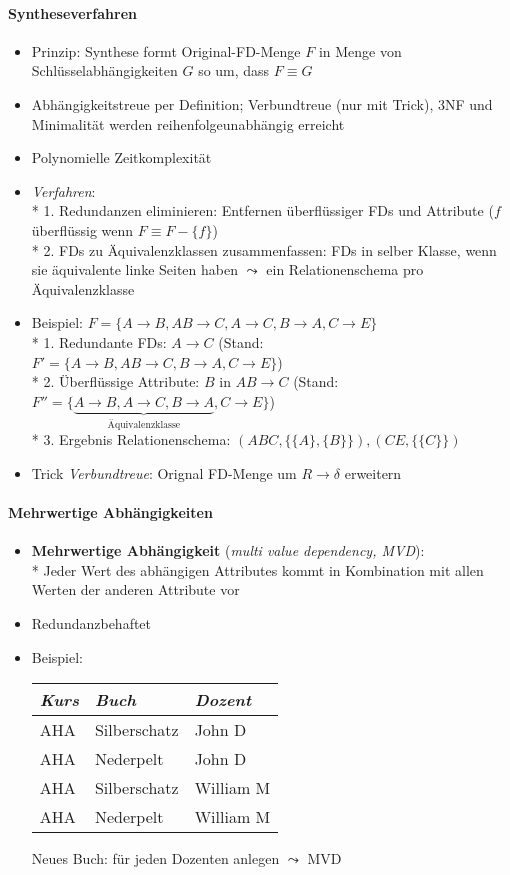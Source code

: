 \paragraph{Syntheseverfahren}
\begin{itemize}
	\item Prinzip: Synthese formt Original-FD-Menge \( F \) in Menge von Schlüsselabhängigkeiten \( G \) so um, dass \( F \equiv G \)
	\item Abhängigkeitstreue per Definition; Verbundtreue (nur mit Trick), 3NF und Minimalität werden reihenfolgeunabhängig erreicht
	\item Polynomielle Zeitkomplexität
	\item \emph{Verfahren}: \\*
		1. Redundanzen eliminieren: Entfernen überflüssiger FDs und Attribute	(\( f \) überflüssig wenn \( F \equiv F - \{  f \} \)) \\*
		2. FDs zu Äquivalenzklassen zusammenfassen: FDs in selber Klasse, wenn sie äquivalente linke Seiten haben \( \leadsto \) ein Relationenschema pro Äquivalenzklasse
	\item Beispiel: \( F = \{ A \to B, AB \to C, A \to C, B \to A, C \to E \} \) \\*
		1. Redundante FDs: \( A \to C \) (Stand: \( F' = \{ A \to B, AB \to C, B \to A, C \to E \} \)) \\*
		2. Überflüssige Attribute: \( B \) in \( AB \to C \) (Stand: \( F'' = \{ \underbrace{A \to B, A \to C, B \to A}_{\text{Äquivalenzklasse}}, C \to E \} \)) \\*
		3. Ergebnis Relationenschema: \( (ABC, \{ \{ A \}, \{ B \} \}), (CE, \{ \{ C \} \}) \)
	\item Trick \emph{Verbundtreue}: Orignal FD-Menge um $R \to \delta$ erweitern
\end{itemize}

\paragraph{Mehrwertige Abhängigkeiten}
\begin{itemize}
	\item \textbf{Mehrwertige Abhängigkeit} (\emph{multi value dependency, MVD}): \\*
		Jeder Wert des abhängigen Attributes kommt in Kombination mit allen Werten der anderen Attribute vor
	\item Redundanzbehaftet
	\item Beispiel:
	\begin{center}
		\begin{tabular}{|lll|}
		  \hline
		  \emph{Kurs} & \emph{Buch} & \emph{Dozent} \\
		  \hline
		  AHA & Silberschatz & John D \\
		  AHA & Nederpelt & John D \\
		  AHA & Silberschatz & William M \\
		  AHA & Nederpelt & William M \\
		  \hline
		\end{tabular}
	\end{center}
	Neues Buch: für jeden Dozenten anlegen \( \leadsto \) MVD
\end{itemize}

